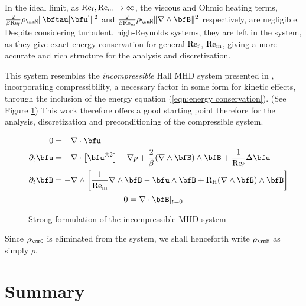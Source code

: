     In the ideal limit, as $\mathrm{Re}_{\mathrm{f}}, \mathrm{Re}_{\mathrm{m}}  \rightarrow  \infty$, the viscous and Ohmic heating terms, $\frac{2}{\beta\rmRef}\rho_{\rmM}\|\bftau[\bfu]\|^{2}$ and $\frac{2}{\beta\rmRem}\rho_{\rmM}\|\nabla\wedge\bfB\|^{2}$ respectively, are negligible. Despite considering turbulent, high-Reynolds systems, they are left in the system, as they give exact energy conservation for general $\mathrm{Re}_{\mathrm{f}}$, $\mathrm{Re}_{\mathrm{m}}$, giving a more accurate and rich structure for the analysis and discretization.

    This system resembles the \emph{incompressible} Hall MHD system presented in \cite{Laakmann_Hu_Farrell_2022}, incorporating compressibility, a necessary factor in some form for kinetic effects, through the inclusion of the energy equation (\ref{eqn:energy conservation}). (See Figure \ref{fig:incompressible strong form}) This work therefore offers a good starting point therefore for the analysis, discretization and preconditioning of the compressible system.

    \begin{figure}
        \centering
        \line
        \begin{align}
            0  &=  - \nabla\cdot\bfu  \\
            \partial_{t}\bfu  &=  -  \nabla\cdot\left[\bfu^{\otimes 2}\right] - \nabla p + \frac{2}{\beta}(\nabla\wedge\bfB)\wedge\bfB + \frac{1}{\rmRef}\Delta\bfu  \\
            \partial_{t}\bfB  &=  - \nabla\wedge\left[\frac{1}{\rmRem}\nabla\wedge\bfB - \bfu\wedge\bfB + \rmRH(\nabla\wedge\bfB)\wedge\bfB\right]
        \end{align}
        \shortline
        \begin{equation}
            0  =  \nabla\cdot\bfB|_{t = 0}
        \end{equation}
        \line
        \caption{Strong formulation of the incompressible MHD system}
        \label{fig:incompressible strong form}
    \end{figure}

    Since $\rho_{\rmC}$ is eliminated from the system, we shall henceforth write $\rho_{\rmM}$ as simply $\rho$.

    
    
    
    
    
    
    

    
    \section*{Summary}
    